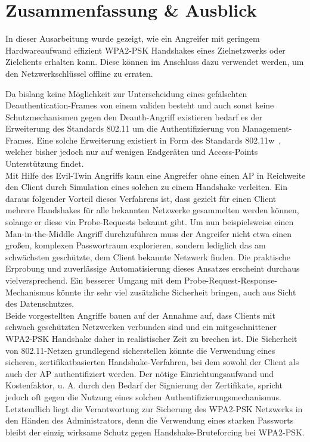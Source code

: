 \section{Zusammenfassung \& Ausblick}
In dieser Ausarbeitung wurde gezeigt, wie ein Angreifer mit geringem Hardwareaufwand effizient WPA2-PSK Handshakes eines Zielnetzwerks oder Zielclients erhalten kann. 
Diese können im Anschluss dazu verwendet werden, um den Netzwerkschlüssel offline zu erraten.

Da bislang keine Möglichkeit zur Unterscheidung eines gefälschten Deauthentication-Frames von einem validen besteht und auch sonst keine Schutzmechanismen gegen den Deauth-Angriff existieren bedarf es der Erweiterung des Standards 802.11 um die Authentifizierung von Management-Frames. 
Eine solche Erweiterung existiert in Form des Standards 802.11w~\cite{Ahmad:2011:SPS:1998412.1998424}, welcher bisher jedoch nur auf wenigen Endgeräten und Access-Points Unterstützung findet.\\

Mit Hilfe des Evil-Twin Angriffs kann eine Angreifer ohne einen AP in Reichweite den Client durch Simulation eines solchen zu einem Handshake verleiten.
Ein daraus folgender Vorteil dieses Verfahrens ist, dass gezielt für einen Client mehrere Handshakes für alle bekannten Netzwerke gesammelten werden können, solange er diese via Probe-Requests bekannt gibt.
Um nun beispielsweise einen Man-in-the-Middle Angriff durchzuführen muss der Angreifer nicht etwa einen großen, komplexen Passwortraum explorieren, sondern lediglich das am schwächsten geschützte, dem Client bekannte Netzwerk finden. Die praktische Erprobung und zuverlässige Automatisierung dieses Ansatzes erscheint durchaus vielversprechend.
Ein besserer Umgang mit dem Probe-Request-Response-Mechanismus könnte ihr sehr viel zusätzliche Sicherheit bringen, auch aus Sicht des Datenschutzes.\\

Beide vorgestellten Angriffe bauen auf der Annahme auf, dass Clients mit schwach geschützten Netzwerken verbunden sind und ein mitgeschnittener WPA2-PSK Handshake daher in realistischer Zeit zu brechen ist. Die Sicherheit von 802.11-Netzen grundlegend sicherstellen könnte die Verwendung eines sicheren, zertifikatbasierten Handshake-Verfahren, bei dem sowohl der Client als auch der AP authentifiziert werden.
Der nötige Einrichtungsaufwand und Kostenfaktor, u. A. durch den Bedarf der Signierung der Zertifikate, spricht jedoch oft gegen die Nutzung eines solchen Authentifizierungsmechanismus.
Letztendlich liegt die Verantwortung zur Sicherung des WPA2-PSK Netzwerks in den Händen des Administrators, denn die Verwendung eines starken Passworts bleibt der einzig wirksame Schutz gegen Handshake-Bruteforcing bei WPA2-PSK. 
